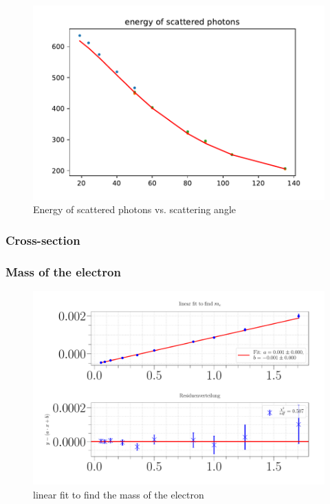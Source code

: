 \documentclass[a4paper,12pt]{article}
\begin{document}
\begin{figure}
\center
\includegraphics[scale=0.3]{../Figures/E_Phi.pdf}
\caption{Energy of scattered photons vs. scattering angle}
\label{resolution}
\end{figure}
\newpage

\subsubsection{Cross-section}

\subsubsection{Mass of the electron}

\begin{figure}
\center
\includegraphics[scale=0.3]{../Figures/linearfittofindme.pdf}
\caption{linear fit to find the mass of the electron}
\label{meFit}
\end{figure}
\newpage
\end{document}
